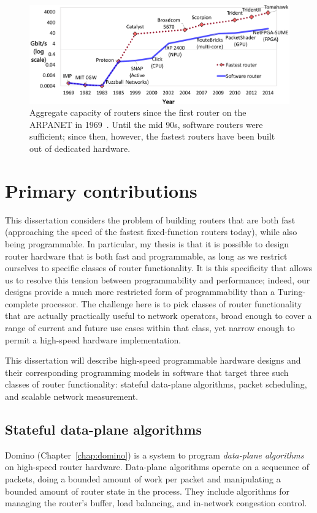 \begin{figure}
\centering
\includegraphics[width=\columnwidth]{router_evolution.pdf}
\caption{Aggregate capacity of routers since the first router on the ARPANET in
1969~\cite{imp}. Until the mid 90s, software routers were sufficient; since
then, however, the fastest routers have been built out of dedicated hardware.}
\label{fig:router_evolution}
\end{figure}

\section{Primary contributions}

This dissertation considers the problem of building routers that are both fast
(\ie approaching the speed of the fastest fixed-function routers today), while
also being programmable. In particular, my thesis is that it is possible to
design router hardware that is both fast and programmable, as long as we
restrict ourselves to specific classes of router functionality. It is this
specificity that allows us to resolve this tension between programmability and
performance; indeed, our designs provide a much more restricted form of
programmability than a Turing-complete processor. The challenge here is to pick
classes of router functionality that are actually practically useful to network
operators, broad enough to cover a range of current and future use cases within
that class, yet narrow enough to permit a high-speed hardware implementation.

This dissertation will describe high-speed programmable hardware designs and
their corresponding programming models in software that target three such
classes of router functionality: stateful data-plane algorithms, packet
scheduling, and scalable network measurement.

\subsection{Stateful data-plane algorithms}
Domino (Chapter~\ref{chap:domino}) is a system to program \textit{data-plane
algorithms} on high-speed router hardware. Data-plane algorithms operate on a
sequeunce of packets, doing a bounded amount of work per packet and
manipulating a bounded amount of router state in the process.  They include
algorithms for managing the router's buffer, load balancing, and in-network
congestion control.

